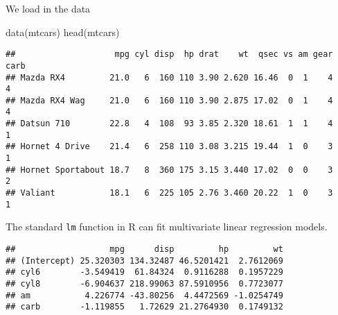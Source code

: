 \documentclass[
  ignorenonframetext,
]{beamer}
\newenvironment{Shaded}{\begin{snugshade}}{\end{snugshade}}
\newcommand{\AttributeTok}[1]{\textcolor[rgb]{0.77,0.63,0.00}{#1}}
\newcommand{\CommentTok}[1]{\textcolor[rgb]{0.56,0.35,0.01}{\textit{#1}}}
\newcommand{\ConstantTok}[1]{\textcolor[rgb]{0.00,0.00,0.00}{#1}}
\newcommand{\FunctionTok}[1]{\textcolor[rgb]{0.00,0.00,0.00}{#1}}
\newcommand{\NormalTok}[1]{#1}
\newcommand{\OtherTok}[1]{\textcolor[rgb]{0.56,0.35,0.01}{#1}}
\newcommand{\SpecialCharTok}[1]{\textcolor[rgb]{0.00,0.00,0.00}{#1}}
\newcommand{\StringTok}[1]{\textcolor[rgb]{0.31,0.60,0.02}{#1}}
\begin{document}
\begin{frame}[fragile]{}
\protect\hypertarget{section}{}
We load in the data

\vspace{12pt}
\tiny

\begin{Shaded}
\begin{Highlighting}[]
\FunctionTok{data}\NormalTok{(mtcars)}
\FunctionTok{head}\NormalTok{(mtcars)}
\end{Highlighting}
\end{Shaded}

\begin{verbatim}
##                    mpg cyl disp  hp drat    wt  qsec vs am gear carb
## Mazda RX4         21.0   6  160 110 3.90 2.620 16.46  0  1    4    4
## Mazda RX4 Wag     21.0   6  160 110 3.90 2.875 17.02  0  1    4    4
## Datsun 710        22.8   4  108  93 3.85 2.320 18.61  1  1    4    1
## Hornet 4 Drive    21.4   6  258 110 3.08 3.215 19.44  1  0    3    1
## Hornet Sportabout 18.7   8  360 175 3.15 3.440 17.02  0  0    3    2
## Valiant           18.1   6  225 105 2.76 3.460 20.22  1  0    3    1
\end{verbatim}

\vspace{12pt}
\normalsize

The standard \texttt{lm} function in R can fit multivariate linear
regression models.

\vspace{12pt}
\tiny

\begin{Shaded}
\end{Shaded}

\begin{verbatim}
##                   mpg      disp         hp         wt
## (Intercept) 25.320303 134.32487 46.5201421  2.7612069
## cyl6        -3.549419  61.84324  0.9116288  0.1957229
## cyl8        -6.904637 218.99063 87.5910956  0.7723077
## am           4.226774 -43.80256  4.4472569 -1.0254749
## carb        -1.119855   1.72629 21.2764930  0.1749132
\end{verbatim}
\end{frame}
\end{document}
